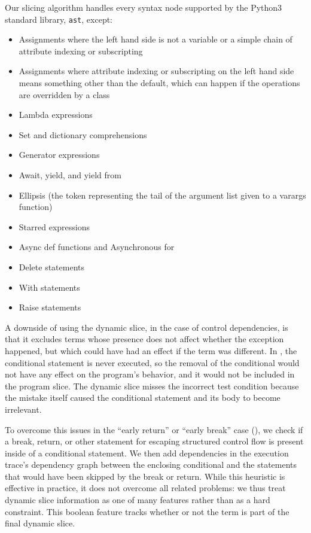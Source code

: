\documentclass[conference]{IEEEtran}
\newcommand\lt[1]{{\lstinline|#1|}}
\begin{document}
Our slicing algorithm handles every syntax node supported by the Python3 standard
library, \lt{ast}, except:
\begin{itemize}
\item Assignments where the left hand side is not a variable or a simple chain
  of attribute indexing or subscripting
\item Assignments where attribute indexing or subscripting on the left hand side
  means something other than the default, which can happen if the operations are
  overridden by a class
\item Lambda expressions
\item Set and dictionary comprehensions
\item Generator expressions
\item Await, yield, and yield from
\item Ellipsis (the token representing the tail of the argument list given to a
  varargs function)
\item Starred expressions
\item Async def functions and Asynchronous for
\item Delete statements
\item With statements
\item Raise statements
\end{itemize}

A downside of using the dynamic slice, in the case of control dependencies, is
that it excludes terms whose presence does not affect whether the exception
happened, but which could have had an effect if the term was different. In
, the conditional statement is never
executed, so the removal of the conditional would not have any effect on
the program's behavior, and it would not be included in the program slice.
The dynamic slice misses the incorrect test condition because the mistake
itself caused the conditional statement and its body to become irrelevant.

To overcome this issues in the ``early return'' or ``early break'' case
(), we check if a break, return, or other statement for
escaping structured control flow is present inside of a conditional
statement. We then add dependencies in the execution trace's dependency graph
between the enclosing conditional and the statements that would have been skipped
by the break or return. While this heuristic is effective in practice, it
does not overcome all related problems: we thus treat dynamic slice
information as one of many features rather than as a hard constraint.
This boolean feature tracks whether or not the term is part of the final
dynamic slice.
\end{document}
